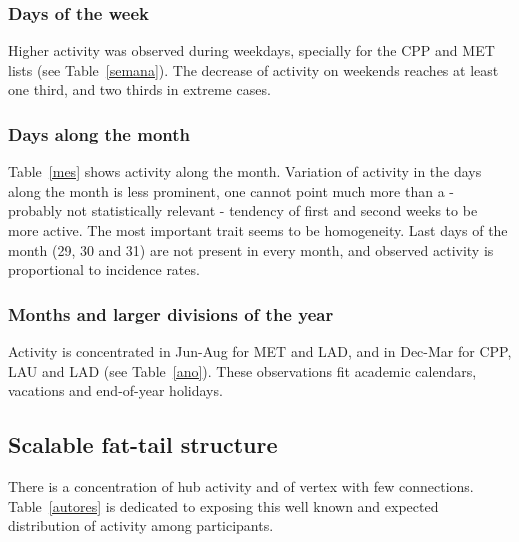 \documentclass[%
 aip,
 jmp,%
 amsmath,amssymb,
 reprint,%
]{revtex4-1}
\begin{document}
\subsubsection{Days of the week}
Higher activity was observed during weekdays, specially for the CPP and MET lists (see Table~\ref{semana}). The decrease of activity on weekends reaches at least one third, and two thirds in extreme cases.

\subsubsection{Days along the month}
Table~\ref{mes} shows activity along the month. Variation of activity in the days along the month is less prominent, one cannot point much more than a - probably not statistically relevant - tendency of first and second weeks to be more active. The most important trait seems to be homogeneity. Last days of the month (29, 30 and 31) are not present in every month, and observed activity is proportional to incidence rates.

\subsubsection{Months and larger divisions of the year}
 Activity is concentrated in Jun-Aug for MET and LAD, and in Dec-Mar for CPP, LAU and LAD (see Table~\ref{ano}). These observations fit academic calendars, vacations and end-of-year holidays.

\subsection{Scalable fat-tail structure}\label{subsec:pih}
There is a concentration of hub activity and of vertex with few connections. Table~\ref{autores} is dedicated to exposing this well known and expected distribution of activity among participants.
\end{document}
